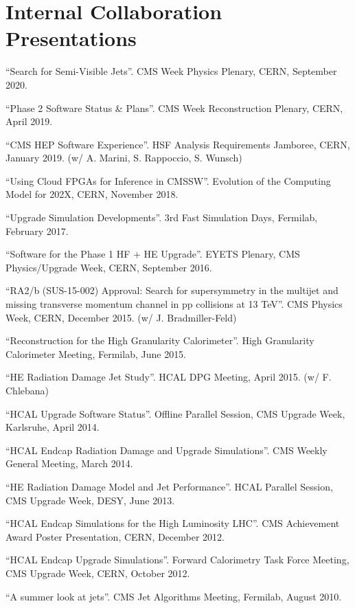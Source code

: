 \ifdefined\longflag
\section{Internal Collaboration Presentations}
\begin{description}[leftmargin=12pt,font=\normalfont,labelsep=0em]
\item ``Search for Semi-Visible Jets''. CMS Week Physics Plenary, CERN, September 2020.
\item ``Phase 2 Software Status \& Plans''. CMS Week Reconstruction Plenary, CERN, April 2019.
\item ``CMS HEP Software Experience''. HSF Analysis Requirements Jamboree, CERN, January 2019. (w/ A. Marini, S. Rappoccio, S. Wunsch)
\item ``Using Cloud FPGAs for Inference in CMSSW''. Evolution of the Computing Model for 202X, CERN, November 2018.
\item ``Upgrade Simulation Developments''. 3rd Fast Simulation Days, Fermilab, February 2017.
\item ``Software for the Phase 1 HF + HE Upgrade''. EYETS Plenary, CMS Physics/Upgrade Week, CERN, September 2016.
\item ``RA2/b (SUS-15-002) Approval: Search for supersymmetry in the multijet and missing transverse momentum channel in pp collisions at 13 TeV''. CMS Physics Week, CERN, December 2015. (w/ J. Bradmiller-Feld)
\item ``Reconstruction for the High Granularity Calorimeter''. High Granularity Calorimeter Meeting, Fermilab, June 2015.
\item ``HE Radiation Damage Jet Study''. HCAL DPG Meeting, April 2015. (w/ F. Chlebana)
\item ``HCAL Upgrade Software Status''. Offline Parallel Session, CMS Upgrade Week, Karlsruhe, April 2014.
\item ``HCAL Endcap Radiation Damage and Upgrade Simulations''. CMS Weekly General Meeting, March 2014.
\item ``HE Radiation Damage Model and Jet Performance''. HCAL Parallel Session, CMS Upgrade Week, DESY, June 2013.
\item ``HCAL Endcap Simulations for the High Luminosity LHC''. CMS Achievement Award Poster Presentation, CERN, December 2012.
\item ``HCAL Endcap Upgrade Simulations''. Forward Calorimetry Task Force Meeting, CMS Upgrade Week, CERN, October 2012.
\item ``A summer look at jets''. CMS Jet Algorithms Meeting, Fermilab, August 2010.
\end{description}
\fi